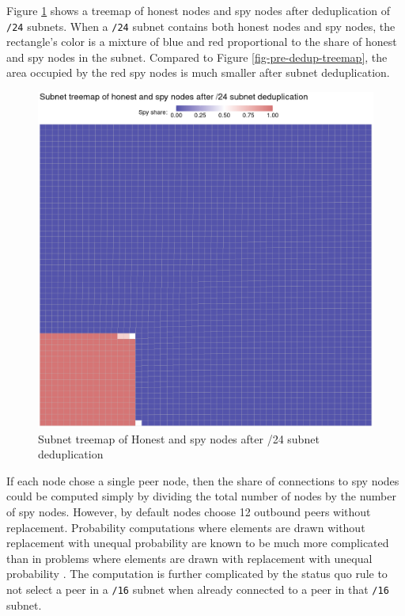 \documentclass[english]{mrl}
\theoremstyle{plain}
\begin{document}
Figure \ref{fig-post-dedup-treemap} shows a treemap of honest nodes
and spy nodes after deduplication of \texttt{/24} subnets. When a
\texttt{/24} subnet contains both honest nodes and spy nodes, the
rectangle's color is a mixture of blue and red proportional to the
share of honest and spy nodes in the subnet. Compared to Figure \ref{fig-pre-dedup-treemap},
the area occupied by the red spy nodes is much smaller after subnet
deduplication.

\begin{figure}[H]
\caption{Subnet treemap of Honest and spy nodes after /24 subnet deduplication}

\label{fig-post-dedup-treemap}

\includegraphics[scale=0.5]{images/treemap-24-subnet-deduplication}
\end{figure}

If each node chose a single peer node, then the share of connections
to spy nodes could be computed simply by dividing the total number
of nodes by the number of spy nodes. However, by default nodes choose
12 outbound peers without replacement. Probability computations where
elements are drawn without replacement with unequal probability are
known to be much more complicated than in problems where elements
are drawn with replacement with unequal probability \cite{TILLE2023100533}.
The computation is further complicated by the status quo rule to not
select a peer in a \texttt{/16} subnet when already connected to a
peer in that \texttt{/16} subnet.
\end{document}
